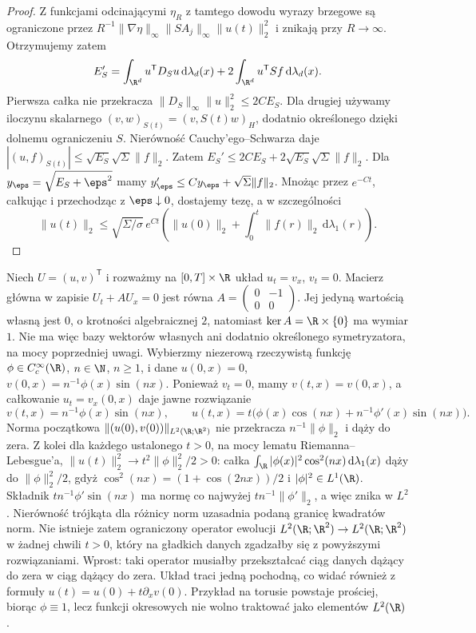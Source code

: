 \begin{proof}
Z funkcjami odcinającymi $\eta_R$ z tamtego dowodu
wyrazy brzegowe są ograniczone przez
$R^{-1}\|\nabla\eta\|_\infty\|SA_j\|_\infty\|u(t)\|_2^2$
i znikają przy $R\to\infty$.
Otrzymujemy zatem
\[
 E_S'=\int_{\R^d}u^\mathsf TD_Su\,\mathrm d\lambda_d(x)
       +2\int_{\R^d}u^\mathsf TSf\,\mathrm d\lambda_d(x).
\]
Pierwsza całka nie przekracza
$\|D_S\|_\infty\|u\|_2^2\le 2CE_S$.
Dla drugiej używamy iloczynu skalarnego
$(v,w)_{S(t)}=(v,S(t)w)_H$, dodatnio określonego
dzięki dolnemu ograniczeniu $S$.
Nierówność Cauchy'ego--Schwarza daje
$|(u,f)_{S(t)}|\le\sqrt{E_S}\sqrt{\Sigma}\|f\|_2$.
Zatem $E_S'\le 2CE_S+2\sqrt{E_S}\sqrt\Sigma\|f\|_2$.
Dla $y_\eps=\sqrt{E_S+\eps^2}$ mamy
$y_\eps'\le Cy_\eps+\sqrt\Sigma\|f\|_2$.
Mnożąc przez $e^{-Ct}$, całkując i przechodząc
z $\eps\downarrow0$, dostajemy tezę, a w szczególności
\[
 \|u(t)\|_2\le \sqrt{\Sigma/\sigma}\,e^{Ct}
 \left(\|u(0)\|_2+\int_0^t\|f(r)\|_2\,\mathrm d\lambda_1(r)\right).
\]
\end{proof}

\begin{kontrprzyklad}\label{ex:pde21-jordan}
Niech $U=(u,v)^\mathsf T$ i rozważmy na
$[0,T]\times\R$ układ $u_t=v_x$, $v_t=0$.
Macierz główna w zapisie $U_t+AU_x=0$ jest równa
$A=\begin{pmatrix}0&-1\\0&0\end{pmatrix}$.
Jej jedyną wartością własną jest $0$, o krotności
algebraicznej $2$, natomiast $\ker A=\R\times\{0\}$
ma wymiar $1$. Nie ma więc bazy wektorów własnych
ani dodatnio określonego symetryzatora, na mocy
poprzedniej uwagi. Wybierzmy niezerową rzeczywistą funkcję
$\phi\in C_c^\infty(\R)$, $n\in\N$, $n\ge1$, i dane
$u(0,x)=0$, $v(0,x)=n^{-1}\phi(x)\sin(nx)$.
Ponieważ $v_t=0$, mamy $v(t,x)=v(0,x)$,
a całkowanie $u_t=v_x(0,x)$ daje jawne rozwiązanie
\[
 v(t,x)=n^{-1}\phi(x)\sin(nx),\qquad
 u(t,x)=t\bigl(\phi(x)\cos(nx)+n^{-1}\phi'(x)\sin(nx)\bigr).
\]
Norma początkowa $\|(u(0),v(0))\|_{L^2(\R;\R^2)}$
nie przekracza $n^{-1}\|\phi\|_2$ i dąży do zera.
Z kolei dla każdego ustalonego $t>0$,
na mocy lematu Riemanna--Lebesgue'a,
$\|u(t)\|_2^2\to t^2\|\phi\|_2^2/2>0$:
całka $\int_{\R}|\phi(x)|^2\cos^2(nx)\,
\mathrm d\lambda_1(x)$ dąży do $\|\phi\|_2^2/2$,
gdyż $\cos^2(nx)=(1+\cos(2nx))/2$ i
$|\phi|^2\in L^1(\R)$. Składnik
$t n^{-1}\phi'\sin(nx)$ ma normę co najwyżej
$t n^{-1}\|\phi'\|_2$, a więc znika w $L^2$.
Nierówność trójkąta dla różnicy norm uzasadnia
podaną granicę kwadratów norm.
Nie istnieje zatem ograniczony operator ewolucji
$L^2(\R;\R^2)\to L^2(\R;\R^2)$ w żadnej chwili $t>0$,
który na gładkich danych zgadzałby się z powyższymi
rozwiązaniami. Wprost: taki operator musiałby
przekształcać ciąg danych dążący do zera w ciąg
dążący do zera. Układ traci jedną pochodną,
co widać również z formuły
$u(t)=u(0)+t\partial_xv(0)$.
Przykład na torusie powstaje prościej, biorąc $\phi\equiv1$,
lecz funkcji okresowych nie wolno traktować jako elementów
$L^2(\R)$.
\end{kontrprzyklad}

